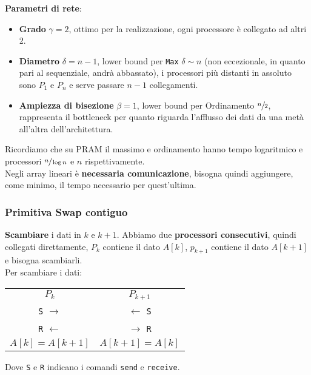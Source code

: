 \textbf{Parametri di rete}: 
\begin{itemize}
	\item \textbf{Grado} $\gamma = 2$, ottimo per la realizzazione, ogni processore è collegato ad altri 2.\\
	
	\item \textbf{Diametro} $\delta = n-1$, lower bound per \texttt{Max} $\delta \sim n$ (non eccezionale, in quanto pari al sequenziale, andrà abbassato), i processori più distanti in assoluto sono $P_1$ e $P_n$ e serve passare $n-1$ collegamenti.\\
	
	\item \textbf{Ampiezza di bisezione} $\beta = 1$, lower bound per Ordinamento $\sfrac{n}{2}$, rappresenta il bottleneck per quanto riguarda l'afflusso dei dati da una metà all'altra dell'architettura.\\
\end{itemize}

Ricordiamo che su PRAM il massimo e ordinamento hanno tempo logaritmico e processori $\sfrac{n}{\log n}$ e $n$ rispettivamente. \\

Negli array lineari è \textbf{necessaria comunicazione}, bisogna quindi aggiungere, come minimo, il tempo necessario per quest'ultima.\\

\newpage

\subsubsection{Primitiva Swap contiguo}

\textbf{Scambiare} i dati in $k$ e $k+1$. Abbiamo due \textbf{processori consecutivi}, quindi collegati direttamente, $P_k$ contiene il dato $A[k]$, $p_{k+1}$ contiene il dato $A[k+1]$ e bisogna scambiarli.\\

Per scambiare i dati:
\begin{center}
	\begin{tabular}{c c}
		$P_k$ & $P_{k+1}$ \\
		\texttt{S} $\rightarrow$ & $\leftarrow$ \texttt{S} \\
		\texttt{R} $\leftarrow$ & $\rightarrow$ \texttt{R} \\
		$A[k] = A[k+1]$ & $A[k+1] = A[k]$ \\
	\end{tabular}
\end{center}
Dove \texttt{S} e \texttt{R} indicano i comandi \texttt{send} e \texttt{receive}. \\

